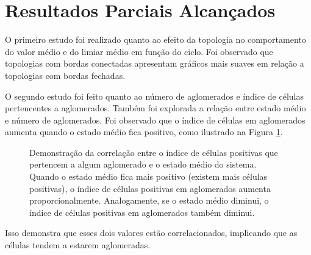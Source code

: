 \documentclass[
	12pt,				%
	openright,			%
	twoside,			%
	a4paper,			%
	english,			%
	french,				%
	spanish,			%
	brazil				%
	]{abntex2}
\begin{document}
\section*{Resultados Parciais Alcançados}

O primeiro estudo foi realizado quanto ao efeito da topologia no comportamento do valor médio e do limiar médio em função do ciclo. Foi observado que topologias com bordas conectadas apresentam gráficos mais suaves em relação a topologias com bordas fechadas. %

%

O segundo estudo foi feito quanto ao número de aglomerados e índice de células pertencentes a aglomerados. Também foi explorada a relação entre estado médio e número de aglomerados. Foi observado que o índice de células em aglomerados aumenta quando o estado médio fica positivo, como ilustrado na Figura \ref{fig:dataL2000Q100CellInClusterAvgStateVsCycle}. 
\begin{figure}[h]
    \centering
    \caption{Demonstração da correlação entre o índice de células positivas que pertencem a algum aglomerado e o estado médio do sistema. Quando o estado médio fica mais positivo (existem mais células positivas), o índice de células positivas em aglomerados aumenta proporcionalmente. Analogamente, se o estado médio diminui, o índice de células positivas em aglomerados também diminui.}
    \label{fig:dataL2000Q100CellInClusterAvgStateVsCycle}
\end{figure}
Isso demonstra que esses dois valores estão correlacionados, implicando que as células tendem a estarem aglomeradas. 
\end{document}
